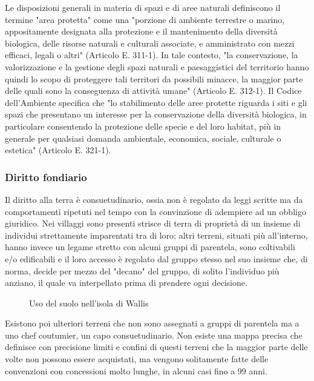 \documentclass[fleqn,11pt]{SelfArx} %
\begin{document}
Le disposizioni generali in materia di spazi e di aree naturali definiscono il termine "area protetta" come una "porzione di ambiente terrestre o marino, appositamente designata alla protezione e il mantenimento della diversità biologica, delle risorse naturali e culturali associate, e amministrato con mezzi efficaci, legali o altri" (Articolo E. 311-1).
In tale contesto, "la conservazione, la valorizzazione e la  gestione degli spazi naturali e paesaggistici del territorio hanno quindi lo scopo di proteggere tali territori da possibili minacce, la maggior parte delle quali sono la conseguenza di attività umane" (Articolo E. 312-1). 
Il Codice dell'Ambiente specifica che "lo stabilimento delle aree protette riguarda i siti e gli spazi che presentano un interesse per la conservazione della diversità biologica, in particolare consentendo la protezione delle specie e del loro habitat, più in generale per qualsiasi domanda ambientale, economica, sociale, culturale o estetica" (Articolo E. 321-1).

\subsubsection{Diritto fondiario}
Il diritto alla terra è consuetudinario, ossia non è regolato da leggi scritte ma da comportamenti ripetuti nel tempo con la convinzione di adempiere ad un obbligo giuridico. 
Nei villaggi sono presenti strisce di terra di proprietà di un insieme di individui strettamente imparentati tra di loro; altri terreni, situati più all'interno, hanno invece un legame stretto con alcuni gruppi di parentela, sono coltivabili e/o edificabili e il loro accesso è regolato dal gruppo stesso nel suo insieme che, di norma, decide per mezzo del "decano" del gruppo, di solito l'individuo più anziano, il quale va interpellato prima di prendere ogni decisione. 

\begin{figure}[ht]\centering
	\caption{Uso del suolo nell'isola di Wallis}
	\label{fig:wallis_land}
\end{figure}


Esistono poi ulteriori terreni che non sono assegnati a gruppi di parentela ma a uno chef coutumier, un capo consuetudinario.  
Non esiste una mappa precisa che definisce con precisione limiti e confini di questi terreni che la maggior parte delle volte non possono essere acquistati, ma vengono solitamente fatte delle convenzioni con concessioni molto lunghe, in alcuni casi fino a 99 anni. 
\end{document}
